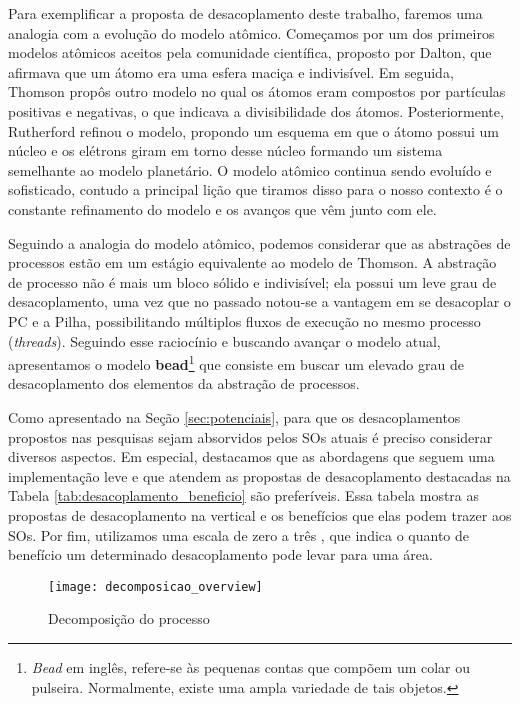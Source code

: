 Para exemplificar a proposta de desacoplamento deste trabalho, faremos uma
analogia com a evolução do modelo atômico. Começamos por um dos primeiros
modelos atômicos aceitos pela comunidade científica, proposto por Dalton, que
afirmava que um átomo era uma esfera maciça e indivisível. Em seguida, Thomson
propôs outro modelo no qual os átomos eram compostos por partículas positivas e
negativas, o que indicava a divisibilidade dos átomos. Posteriormente, Rutherford
refinou o modelo, propondo um esquema em que o átomo possui um núcleo e os
elétrons giram em torno desse núcleo formando um sistema semelhante ao modelo
planetário. O modelo atômico continua sendo evoluído e sofisticado, contudo a principal lição que tiramos disso para o nosso contexto é o
constante refinamento do modelo e os avanços que vêm junto com ele.

Seguindo a analogia do modelo atômico, podemos considerar que as abstrações de
processos estão em um estágio equivalente ao modelo de Thomson. A abstração de
processo não é mais um bloco sólido e indivisível; ela possui um leve grau de
desacoplamento, uma vez que no passado notou-se a vantagem em se desacoplar o PC
e a Pilha, possibilitando múltiplos fluxos de execução no mesmo processo
(\emph{threads}). Seguindo esse raciocínio e buscando avançar o modelo atual,
apresentamos o modelo \textbf{bead}\footnote{\emph{Bead} em inglês,
refere-se às pequenas contas que compõem um colar ou pulseira. Normalmente,
existe uma ampla variedade de tais objetos.} que consiste em buscar um elevado
grau de desacoplamento dos elementos da abstração de processos.




Como apresentado na Seção \ref{sec:potenciais}, para que os desacoplamentos
propostos nas pesquisas sejam absorvidos pelos SOs atuais é preciso considerar
diversos aspectos. Em especial, destacamos que as abordagens que seguem uma
implementação leve e que atendem as propostas de desacoplamento destacadas na
Tabela \ref{tab:desacoplamento_beneficio} são preferíveis. Essa tabela mostra as
propostas de desacoplamento na vertical e os benefícios que elas podem trazer
aos SOs. Por fim, utilizamos uma escala de zero a três , que indica o
quanto de benefício um determinado desacoplamento pode levar para uma área.

\begin{figure}[!h]
  \centering
  \texttt{[image: decomposicao\_overview]}
  \caption{Decomposição do processo}
  \label{fig:decomposicao_proc}
\end{figure}

